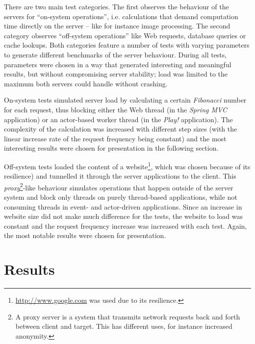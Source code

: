 There are two main test categories. The first observes the behaviour of the servers for ``on-system operations'', i.e. calculations that demand computation time directly on the server -- like for instance image processing. The second category observes ``off-system operations'' like Web requests, database queries or cache lookups. Both categories feature a number of tests with varying parameters to generate different benchmarks of the server behaviour. During all tests, parameters were chosen in a way that generated interesting and meaningful results, but without compromising server stability; load was limited to the maximum both servers could handle without crashing.

On-system tests simulated server load by calculating a certain \textit{Fibonacci} number for each request, thus blocking either the Web thread (in the \textit{Spring MVC} application) or an actor-based worker thread (in the \textit{Play!} application). The complexity of the calculation was increased with different step sizes (with the linear increase rate of the request frequency being constant) and the most interesting results were chosen for presentation in the following section. 

Off-system tests loaded the content of a website\footnote{\url{http://www.google.com} was used due to its resilience.}, which was chosen because of its resilience) and tunnelled it through the server applications to the client. This \textit{proxy}\footnote{A proxy server is a system that transmits network requests back and forth between client and target. This has different uses, for instance increased anonymity.}-like behaviour simulates operations that happen outside of the server system and block only threads on purely thread-based applications, while not consuming threads in event- and actor-driven applications. Since an increase in website size did not make much difference for the tests, the website to load was constant and the request frequency increase was increased with each test. Again, the most notable results were chosen for presentation.

\section{Results}
